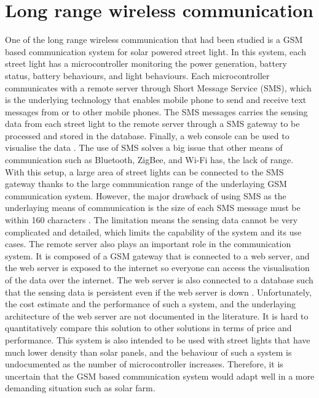 \documentclass[../thesis.tex]{subfiles}
\begin{document}
\section{Long range wireless communication}

One of the long range wireless communication that had been studied is a GSM based communication system for solar powered street light. In this system, each street light has a microcontroller monitoring the power generation, battery status, battery behaviours, and light behaviours. Each microcontroller communicates with a remote server through Short Message Service (SMS), which is the underlying technology that enables mobile phone to send and receive text messages from or to other mobile phones. The SMS messages carries the sensing data from each street light to the remote server through a SMS gateway to be processed and stored in the database. Finally, a web console can be used to visualise the data \cite{SiregarSimon2014Spab}. The use of SMS solves a big issue that other means of communication such as Bluetooth, ZigBee, and Wi-Fi has, the lack of range. With this setup, a large area of street lights can be connected to the SMS gateway thanks to the large communication range of the underlaying GSM communication system. However, the major drawback of using SMS as the underlaying means of communication is the size of each SMS message must be within 160 characters \cite{etsi.org_1995}. The limitation means the sensing data cannot be very complicated and detailed, which limits the capability of the system and its use cases. The remote server also plays an important role in the communication system. It is composed of a GSM gateway that is connected to a web server, and the web server is exposed to the internet so everyone can access the visualisation of the data over the internet. The web server is also connected to a database such that the sensing data is persistent even if the web server is down \cite{SiregarSimon2014Spab}. Unfortunately, the cost estimate and the performance of such a system, and the underlaying architecture of the web server are not documented in the literature. It is hard to quantitatively compare this solution to other solutions in terms of price and performance. This system is also intended to be used with street lights that have much lower density than solar panels, and the behaviour of such a system is undocumented as the number of microcontroller increases. Therefore, it is uncertain that the GSM based communication system would adapt well in a more demanding situation such as solar farm. 
\end{document}
